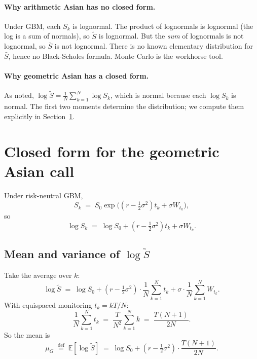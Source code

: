 \documentclass[11pt,a4paper]{article}
\theoremstyle{plain}
\theoremstyle{definition}
\theoremstyle{remark}
\newcommand{\E}{\mathbb{E}}
\newcommand{\eqdef}{\overset{\mathrm{def}}{=}}
\begin{document}
\paragraph{Why arithmetic Asian has no closed form.} Under GBM, each
$S_k$ is lognormal. The product of lognormals is lognormal (the log
is a sum of normals), so $\tilde S$ is lognormal. But the
\emph{sum} of lognormals is not lognormal, so $\bar S$ is not
lognormal. There is no known elementary distribution for $\bar S$,
hence no Black-Scholes formula. Monte Carlo is the workhorse tool.

\paragraph{Why geometric Asian has a closed form.} As noted,
$\log \tilde S = \frac{1}{N}\sum_{k=1}^N \log S_k$, which is normal
because each $\log S_k$ is normal. The first two moments determine
the distribution; we compute them explicitly in
Section~\ref{sec:closed-form}.

\section{Closed form for the geometric Asian call}
\label{sec:closed-form}

Under risk-neutral GBM,
\begin{equation}
S_k \;=\; S_0 \exp\bigl((r - \tfrac{1}{2}\sigma^2)t_k + \sigma W_{t_k}\bigr),
\end{equation}
so
\begin{equation}
\log S_k \;=\; \log S_0 + (r - \tfrac{1}{2}\sigma^2)t_k + \sigma W_{t_k}.
\end{equation}

\subsection{Mean and variance of $\log \tilde S$}

Take the average over $k$:
\begin{equation}
\log \tilde S
\;=\; \log S_0 + (r - \tfrac{1}{2}\sigma^2) \cdot \frac{1}{N}\sum_{k=1}^N t_k
+ \sigma \cdot \frac{1}{N}\sum_{k=1}^N W_{t_k}.
\end{equation}
With equispaced monitoring $t_k = kT/N$:
\begin{equation}
\frac{1}{N}\sum_{k=1}^N t_k
\;=\; \frac{T}{N^2}\sum_{k=1}^N k
\;=\; \frac{T(N+1)}{2N}.
\end{equation}
So the mean is
\begin{equation}
\mu_G \;\eqdef\; \E[\log \tilde S]
\;=\; \log S_0 + (r - \tfrac{1}{2}\sigma^2) \cdot \frac{T(N+1)}{2N}.
\end{equation}
\end{document}
